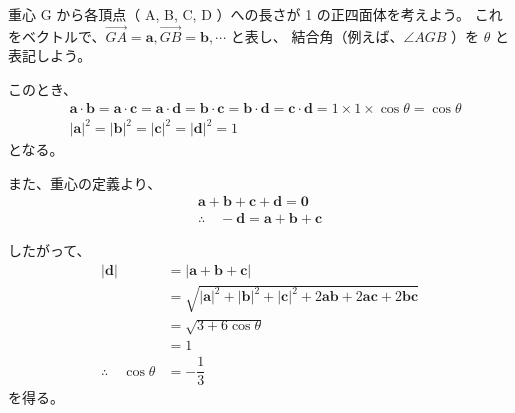 \documentclass[a4paper,11pt]{jlreq}
\begin{document}
重心 G から各頂点（ A, B, C, D ）への長さが 1 の正四面体を考えよう。
これをベクトルで、$\overrightarrow{GA} = {\bm a}, \overrightarrow{GB} = {\bm b}, \cdots$ と表し、
結合角（例えば、$\angle AGB$ ）を $\theta$ と表記しよう。

このとき、
\begin{align*}
&{\bm a} \cdot {\bm b} = {\bm a} \cdot {\bm c} = {\bm a} \cdot {\bm d} = {\bm b} \cdot {\bm c} = {\bm b} \cdot {\bm d} = {\bm c} \cdot {\bm d} = 1 \times 1 \times \cos \theta = \cos \theta \\
&|{\bm a}|^2 = |{\bm b}|^2 = |{\bm c}|^2 = |{\bm d}|^2 = 1
\end{align*}
となる。

また、重心の定義より、
\begin{align*}
{\bm a} + {\bm b} + {\bm c} + {\bm d} = {\bm 0} \\
\therefore \quad -{\bm d} ={\bm a} + {\bm b} + {\bm c}
\end{align*}

したがって、
\begin{align*}
|{\bm d} | 
	&= |{\bm a} + {\bm b} + {\bm c}| \\
	&= \sqrt{ |{\bm a}|^2 + |{\bm b}|^2 + |{\bm c}|^2 + 2{\bm a}{\bm b} + 2{\bm a}{\bm c} + 2{\bm b}{\bm c} } \\
	&= \sqrt{ 3 + 6 \cos \theta } \\
	&= 1 \\
\therefore \quad \cos \theta &= -\dfrac{1}{3}
\end{align*}
を得る。
\end{document}
